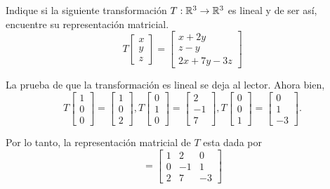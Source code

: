 \begin{problema}
 Indique si la siguiente transformaci\'on $T:\mathbb{R}^{3}\to \mathbb{R}^{3}$ es lineal y de ser as\'i, encuentre su representaci\'on
matricial.
\begin{equation}
\label{trans_exmp}
 T\begin{bmatrix}
    x\\y\\z
   \end{bmatrix}=
   \begin{bmatrix}
    x+2y \\ z-y\\ 2x+7y-3z
   \end{bmatrix}
\end{equation}

\end{problema}

\begin{solucion}
 La prueba de que la transformaci\'on es lineal se deja al lector. Ahora bien,
 $$
T\begin{bmatrix}
  1\\0\\0
 \end{bmatrix}
=\begin{bmatrix}
  1\\0\\2
 \end{bmatrix},
 T\begin{bmatrix}
  0\\1\\0
 \end{bmatrix}
=\begin{bmatrix}
  2\\-1\\7
 \end{bmatrix},
T\begin{bmatrix}
  0\\0\\1
 \end{bmatrix}
=\begin{bmatrix}
  0\\1\\-3
 \end{bmatrix}.
 $$

 Por lo tanto, la representaci\'on matricial de $T$ esta dada por
 $$
=\begin{bmatrix}
1 & 2 & 0 \\
0 & -1 & 1 \\
2 & 7 & -3
 \end{bmatrix}
 $$
\end{solucion}



